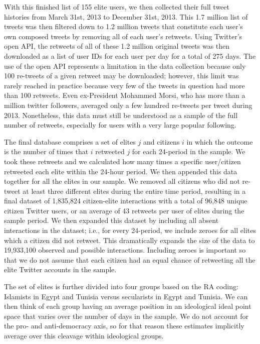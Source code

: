 \documentclass[12pt]{article}
\begin{document}
With this finished list of 155 elite users, we then collected their full tweet histories from March 31st, 2013 to December 31st, 2013. This 1.7 million list of tweets was then filtered down to 1.2 million tweets that constitute each user's own composed tweets by removing all of each user's retweets. Using Twitter's open API, the retweets of all of these 1.2 million original tweets was then downloaded as a list of user IDs for each user per day for a total of 275 days. The use of the open API represents a limitation in the data collection because only 100 re-tweets of a given retweet may be downloaded; however, this limit was rarely reached in practice because very few of the tweets in question had more than 100 retweets. Even ex-President Mohammed Morsi, who has more than a million twitter followers, averaged only a few hundred re-tweets per tweet during 2013. Nonetheless, this data must still be understood as a sample of the full number of retweets, especially for users with a very large popular following.

The final database comprises a set of elites $j$ and citizens $i$ in which the outcome is the number of times that $i$ retweeted $j$ for each 24-period in the sample. We took these retweets and we calculated how many times a specific user/citizen retweeted each elite within the 24-hour period. We then appended this data together for all the elites in our sample. We removed all citizens who did not re-tweet at least three different elites during the entire time period, resulting in a final dataset of 1,835,824 citizen-elite interactions with a total of 96,848 unique citizen Twitter users, or an average of 43 retweets per user of elites during the sample period. We then expanded this dataset by including all absent interactions in the dataset; i.e., for every 24-period, we include zeroes for all elites which a citizen did not retweet. This dramatically expands the size of the data to 19,933,100 observed and possible interactions. Including zeroes is important so that we do not assume that each citizen had an equal chance of retweeting all the elite Twitter accounts in the sample.

The set of elites is further divided into four groups based on the RA coding: Islamists in Egypt and Tunisia versus secularists in Egypt and Tunisia. We can then think of each group having an average position in an ideological ideal point space that varies over the number of days in the sample. We do not account for the pro- and anti-democracy axis, so for that reason these estimates implicitly average over this cleavage within ideological groups.
\end{document}
